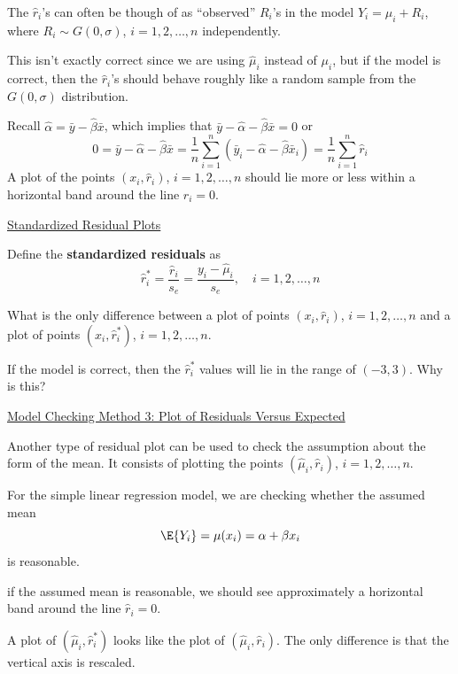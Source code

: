 \documentclass[oneside]{book}
\begin{document}
The $ \hat{r}_i $'s can often be though of as ``observed'' $ R_i $'s in the model $ Y_i=\mu_i+R_i $,
where $ R_i\sim G(0,\sigma) $, $ i=1,2,\ldots ,n $ independently.

This isn't exactly correct since we are using $ \hat{\mu}_i $ instead of $ \mu_i $,
but if the model is correct, then the $ \hat{r}_i $'s should behave roughly like a random
sample from the $ G(0,\sigma) $ distribution.

Recall $ \hat{\alpha}=\bar{y}-\hat{\beta}\bar{x} $, which implies that $ \bar{y}-\hat{\alpha}-\hat{\beta}\bar{x}=0 $
or
\[ 0=\bar{y}-\hat{\alpha}-\hat{\beta}\bar{x}=\frac{1}{n} \sum\limits_{i=1}^{n} \left( \bar{y}_i-\hat{\alpha}-\hat{\beta}\bar{x}_i \right)
    =\frac{1}{n} \sum\limits_{i=1}^{n} \hat{r}_i \]
A plot of the points $ \left( x_i,\hat{r}_i \right) $, $ i=1,2,\ldots ,n $
should lie more or less within a horizontal band around the line $ \hat{r}_i=0 $.

\underline{Standardized Residual Plots}

\begin{Definition}{}{}
    Define the \textbf{standardized residuals} as
    \[\hat{r}_{i}^{*}=\frac{\hat{r}_{i}}{s_{e}}=\frac{y_{i}-\hat{\mu}_{i}}{s_{e}}, \quad i=1,2, \ldots, n\]
\end{Definition}

What is the only difference between a plot of points $ \left( x_i,\hat{r}_i \right) $, $ i=1,2,\ldots ,n $
and a plot of points $ \left( x_i,\hat{r}_i^* \right) $, $ i=1,2,\ldots ,n $.

If the model is correct, then the $ \hat{r}_i^* $ values will lie in the range of $ (-3,3) $. Why is this?

\underline{Model Checking Method 3: Plot of Residuals Versus Expected}

Another type of residual plot can be used to check the assumption about the form of the mean.
It consists of plotting the points $ \left( \hat{\mu}_i,\hat{r}_i \right) $, $ i=1,2,\ldots ,n $.

For the simple linear regression model, we are checking whether the assumed mean
\[ \E{Y_i}=\mu(x_i)=\alpha+\beta x_i \]
is reasonable.

if the assumed mean is reasonable, we should see approximately a horizontal band around the line
$ \hat{r}_i=0 $.

A plot of $ \left( \hat{\mu}_i,\hat{r}_i^* \right) $ looks like the plot of $ \left( \hat{\mu}_i,\hat{r}_i \right) $.
The only difference is that the vertical axis is rescaled.
\end{document}
